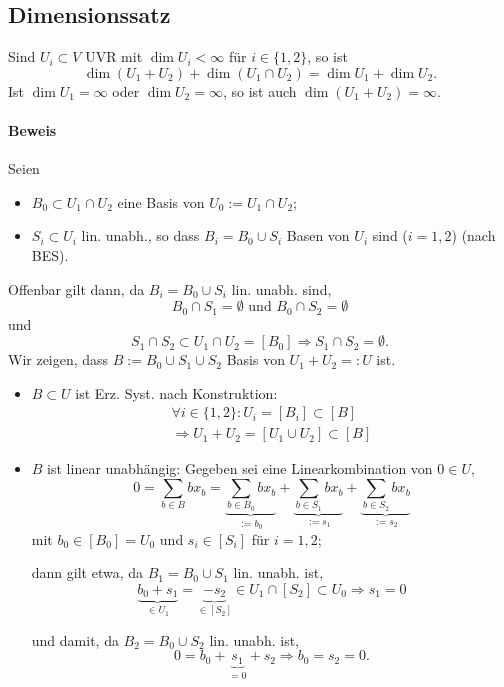 \subsection{Dimensionssatz}
	\begin{Satz}[Dimensionssatz]
	Sind $ U_i \subset V $ UVR mit $ \dim U_i < \infty $ für $ i\in \{1,2\} $, so ist
		\[ \dim (U_1+U_2) + \dim (U_1\cap U_2) = \dim U_1 + \dim U_2. \]	
	Ist $ \dim U_1 = \infty$ oder $ \dim U_2=\infty $, so ist auch $ \dim (U_1+U_2)=\infty $.
	\end{Satz}
	
\paragraph{Beweis}
	Seien
		\begin{itemize}
		\item $ B_0 \subset U_1\cap U_2 $ eine Basis von $ U_0 := U_1\cap U_2 $;
		\item $ S_i \subset U_i $ lin. unabh., so dass $ B_i = B_0 \cup S_i $ Basen von $ U_i $ sind ($ i = 1,2 $) (nach BES).
		\end{itemize}
	Offenbar gilt dann, da $ B_i = B_0\cup S_i $ lin. unabh. sind,
		\[
		B_0\cap S_1 = \emptyset \text{ und } B_0\cap S_2 = \emptyset
		\]
	und 
		\[
		S_1\cap S_2 \subset U_1\cap U_2 = [B_0] \Rightarrow S_1\cap S_2 = \emptyset.
		\]
	Wir zeigen, dass $ B:= B_0\cup S_1\cup S_2 $ Basis von $ U_1 + U_2 =: U $ ist.
	\begin{itemize}
\item	$ B\subset U $ ist Erz. Syst. nach Konstruktion:
		\begin{gather*}
		\forall i\in \{1,2\} : U_i=[B_i]\subset [B]\\
		\Rightarrow U_1+U_2 = [U_1\cup U_2]\subset [B]
		\end{gather*}
	
\item $ B $ ist linear unabhängig:
	Gegeben sei eine Linearkombination von $ 0\in U $,
		\[
		0 = \sum_{b\in B}bx_b = \underbrace{\sum_{b\in B_0}bx_b}_{:=b_0} + \underbrace{\sum_{b\in S_1}bx_b}_{:=s_1} + \underbrace{\sum_{b\in S_2}bx_b}_{:=s_2}
		\]
        mit $b_0\in [B_0] = U_0$ und $s_i\in [S_i]$ für $i= 1,2$;

	dann gilt etwa, da $ B_1 = B_0 \cup S_1 $ lin. unabh. ist,
		\[
		\underbrace{b_0+ s_1}_{\in U_1} = \underbrace{-s_2}_{\in [S_2]} \in U_1\cap [S_2]\subset U_0 \Rightarrow s_1 = 0
		\]
		
	und damit, da $ B_2 = B_0 \cup S_2 $ lin. unabh. ist,
		\[
		0 = b_0 + \underbrace{s_1}_{=0} + s_2 \Rightarrow b_0=s_2 = 0.
		\]
\end{itemize}
